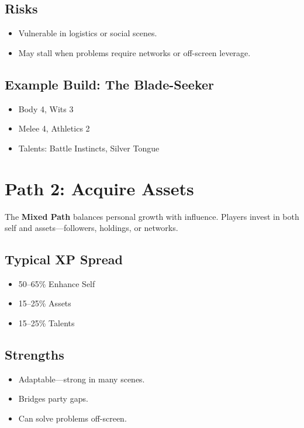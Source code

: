 \subsection*{Risks}
\begin{itemize}
  \item Vulnerable in logistics or social scenes.
  \item May stall when problems require networks or off-screen leverage.
\end{itemize}

\subsection*{Example Build: The Blade-Seeker}
\begin{itemize}
  \item Body 4, Wits 3
  \item Melee 4, Athletics 2
  \item Talents: Battle Instincts, Silver Tongue
\end{itemize}

\section{Path 2: Acquire Assets}

The \textbf{Mixed Path} balances personal growth with influence. Players invest in both self and assets—followers, holdings, or networks.

\subsection*{Typical XP Spread}
\begin{itemize}
  \item 50–65\% Enhance Self
  \item 15–25\% Assets
  \item 15–25\% Talents
\end{itemize}

\subsection*{Strengths}
\begin{itemize}
  \item Adaptable—strong in many scenes.
  \item Bridges party gaps.
  \item Can solve problems off-screen.
\end{itemize}

